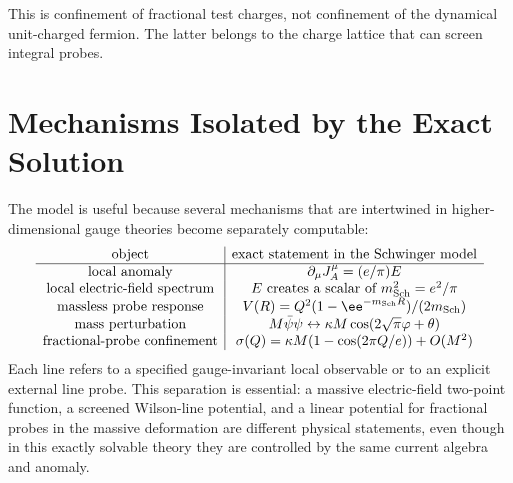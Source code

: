 This is confinement of fractional test charges, not confinement of the
dynamical unit-charged fermion.  The latter belongs to the charge lattice
that can screen integral probes.

\section{Mechanisms Isolated by the Exact Solution}

The model is useful because several mechanisms that are intertwined in
higher-dimensional gauge theories become separately computable:
\[
\begin{array}{c|c}
  \hbox{object} & \hbox{exact statement in the Schwinger model} \\ \hline
  \hbox{local anomaly} &
  \partial_\mu J_A^\mu=(e/\pi)E \\
  \hbox{local electric-field spectrum} &
  E\hbox{ creates a scalar of }m_{\rm Sch}^2=e^2/\pi \\
  \hbox{massless probe response} &
  V(R)=Q^2(1-\ee^{-m_{\rm Sch}R})/(2m_{\rm Sch}) \\
  \hbox{mass perturbation} &
  M\bar\psi\psi\leftrightarrow\kappa M\cos(2\sqrt\pi\varphi+\theta) \\
  \hbox{fractional-probe confinement} &
  \sigma(Q)=\kappa M(1-\cos(2\pi Q/e))+O(M^2)
\end{array}
\]
Each line refers to a specified gauge-invariant local observable or to an
explicit external line probe.  This separation is essential: a massive
electric-field two-point function, a screened Wilson-line potential, and a
linear potential for fractional probes in the massive deformation are
different physical statements, even though in this exactly solvable theory
they are controlled by the same current algebra and anomaly.
